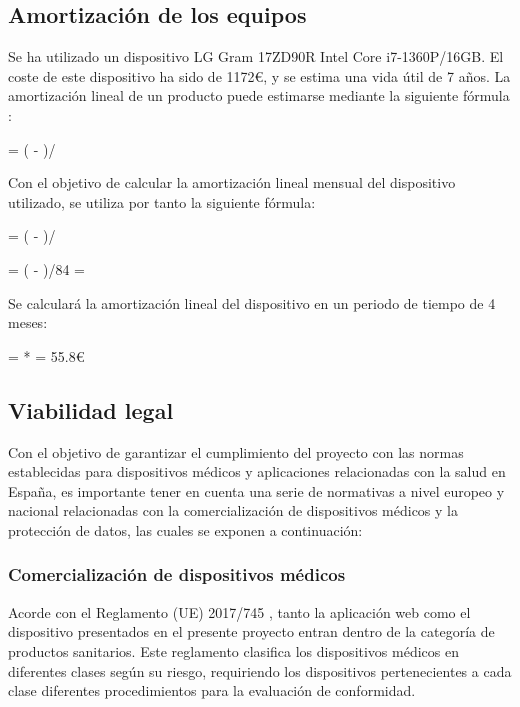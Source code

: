 \subsection{Amortización de los equipos}
Se ha utilizado un dispositivo LG Gram 17ZD90R Intel Core i7-1360P/16GB. El coste de este dispositivo ha sido de 1172€, y se estima una vida útil de 7 años.
La amortización lineal de un producto puede estimarse mediante la siguiente fórmula \cite{liberto2024straightline}:

 = ( - )/ 

Con el objetivo de calcular la amortización lineal mensual del dispositivo utilizado, se utiliza por tanto la siguiente fórmula:

 = ( - )/ 

 = ( - )/84  = 

Se calculará la amortización lineal del dispositivo en un periodo de tiempo de 4 meses:

 = * = 55.8€

\subsection{Viabilidad legal}
Con el objetivo de garantizar el cumplimiento del proyecto con las normas establecidas para dispositivos médicos y aplicaciones relacionadas con la salud en España, es importante tener en cuenta una serie de normativas a nivel europeo y nacional relacionadas con la comercialización de dispositivos médicos y la protección de datos, las cuales se exponen a continuación:
\subsubsection{Comercialización de dispositivos médicos}
Acorde con el Reglamento (UE) 2017/745 \cite{reglamento-ue-2017-745}, tanto la aplicación web como el dispositivo presentados en el presente proyecto entran dentro de la categoría de productos sanitarios. Este reglamento clasifica los dispositivos médicos en diferentes clases según su riesgo, requiriendo los dispositivos pertenecientes a cada clase diferentes procedimientos para la evaluación de conformidad. 

